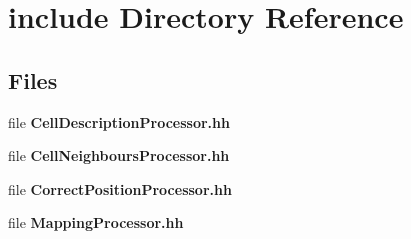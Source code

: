 \section{include Directory Reference}
\label{dir_935d54b3e9737b64e91aa5d57646d35a}
\subsection*{Files}
\begin{DoxyCompactItemize}
\item 
file {\bfseries Cell\-Description\-Processor.\-hh}
\item 
file {\bfseries Cell\-Neighbours\-Processor.\-hh}
\item 
file {\bfseries Correct\-Position\-Processor.\-hh}
\item 
file {\bfseries Mapping\-Processor.\-hh}
\end{DoxyCompactItemize}
